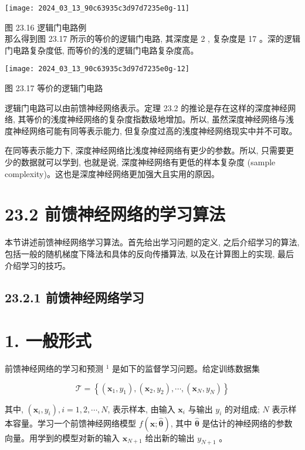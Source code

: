 \documentclass[10pt]{article}
\begin{document}
\begin{CJK*}{UTF8}{bsmi}
\begin{center}
\texttt{[image: 2024\_03\_13\_90c63935c3d97d7235e0g-11]}
\end{center}

图 23.16 逻辑门电路例\\
那么得到图 23.17 所示的等价的逻辑门电路, 其深度是 2 , 复杂度是 17 。深的逻辑门电路复杂度低, 而等价的浅的逻辑门电路复杂度高。

\begin{center}
\texttt{[image: 2024\_03\_13\_90c63935c3d97d7235e0g-12]}
\end{center}

图 23.17 等价的逻辑门电路

逻辑门电路可以由前馈神经网络表示。定理 23.2 的推论是存在这样的深度神经网络, 其等价的浅度神经网络的复杂度指数级地增加。所以, 虽然深度神经网络与浅度神经网络可能有同等表示能力, 但复杂度过高的浅度神经网络现实中并不可取。

在同等表示能力下, 深度神经网络比浅度神经网络有更少的参数。所以, 只需要更少的数据就可以学到, 也就是说, 深度神经网络有更低的样本复杂度 (sample complexity)。这也是深度神经网络更加强大且实用的原因。

\section*{23.2 前馈神经网络的学习算法}
本节讲述前馈神经网络学习算法。首先给出学习问题的定义, 之后介绍学习的算法, 包括一般的随机梯度下降法和具体的反向传播算法, 以及在计算图上的实现, 最后介绍学习的技巧。

\subsection*{23.2.1 前馈神经网络学习}
\section*{1. 一般形式}
前馈神经网络的学习和预测 ${ }^{1}$ 是如下的监督学习问题。给定训练数据集

$$
\mathcal{T}=\left\{\left(\boldsymbol{x}_{1}, y_{1}\right),\left(\boldsymbol{x}_{2}, y_{2}\right), \cdots,\left(\boldsymbol{x}_{N}, y_{N}\right)\right\}
$$

其中, $\left(\boldsymbol{x}_{i}, y_{i}\right), i=1,2, \cdots, N$, 表示样本, 由输入 $\boldsymbol{x}_{i}$ 与输出 $y_{i}$ 的对组成; $N$ 表示样本容量。学习一个前馈神经网络模型 $f(\boldsymbol{x} ; \hat{\boldsymbol{\theta}})$, 其中 $\hat{\boldsymbol{\theta}}$ 是估计的神经网络的参数向量。用学到的模型对新的输入 $\boldsymbol{x}_{N+1}$ 给出新的输出 $y_{N+1}$ 。


\end{CJK*}
\end{document}
